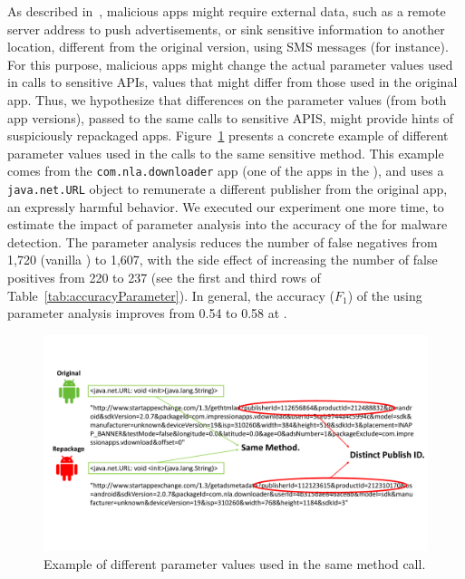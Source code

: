 As described in~\cite{le2018towards}, malicious apps might require external data,
such as a remote server address to push advertisements, or sink sensitive information to another location,
different from the original version, using SMS messages (for instance). For this purpose, malicious apps
might change the actual parameter values used in calls to sensitive APIs, values that might differ from those
used in the original app. Thus, we hypothesize that differences on the parameter values (from both app versions), passed to the same calls to
sensitive APIS, might provide hints of suspiciously repackaged apps. Figure~\ref{fig:parameterDiff} presents a concrete example of
different parameter values used in the calls to the same sensitive method. This example comes from the \texttt{com.nla.downloader} app
(one of the apps in the \cds), and uses a \texttt{java.net.URL} object to remunerate a different publisher from the original app, an expressly harmful behavior. We executed our
experiment one more time, to estimate the impact of parameter analysis into the accuracy of the \mas for
malware detection. 
The parameter analysis reduces the number of false negatives from 1,720 (vanilla \mas) to 1,607, with the side effect of
increasing the number of false positives from 220 to 237 (see the first and third rows of Table~\ref{tab:accuracyParameter}).
In general, the accuracy ($F_1$) of the \mas using parameter analysis improves from 0.54 to 0.58 at \cds.

\begin{figure}[t]
\centering
\includegraphics[scale=0.3]{images/parameterDiff.pdf}
\caption{Example of different parameter values used in the same method call.}
 \label{fig:parameterDiff}
\end{figure}

